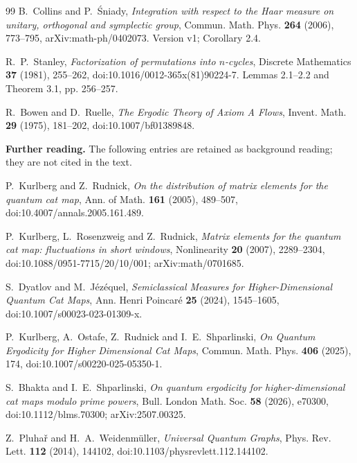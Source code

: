 \begin{thebibliography}{99}
B.~Collins and P.~{\'S}niady,
\emph{Integration with respect to the Haar measure on unitary, orthogonal and symplectic group},
Commun. Math. Phys. \textbf{264} (2006), 773--795,
arXiv:math-ph/0402073.
Version v1; Corollary 2.4.

R.~P.~Stanley,
\emph{Factorization of permutations into $n$-cycles},
Discrete Mathematics \textbf{37} (1981), 255--262,
doi:10.1016/0012-365x(81)90224-7.
Lemmas 2.1--2.2 and Theorem 3.1, pp. 256--257.

R.~Bowen and D.~Ruelle,
\emph{The Ergodic Theory of Axiom A Flows},
Invent. Math. \textbf{29} (1975), 181--202,
doi:10.1007/bf01389848.

\item[] \textbf{Further reading.} The following entries are retained
as background reading; they are not cited in the text.

P.~Kurlberg and Z.~Rudnick,
\emph{On the distribution of matrix elements for the quantum cat map},
Ann. of Math. \textbf{161} (2005), 489--507,
doi:10.4007/annals.2005.161.489.

P.~Kurlberg, L.~Rosenzweig and Z.~Rudnick,
\emph{Matrix elements for the quantum cat map: fluctuations in short windows},
Nonlinearity \textbf{20} (2007), 2289--2304,
doi:10.1088/0951-7715/20/10/001; arXiv:math/0701685.

S.~Dyatlov and M.~J\'ez\'equel,
\emph{Semiclassical Measures for Higher-Dimensional Quantum Cat Maps},
Ann. Henri Poincar\'e \textbf{25} (2024), 1545--1605,
doi:10.1007/s00023-023-01309-x.

P.~Kurlberg, A.~Ostafe, Z.~Rudnick and I.~E.~Shparlinski,
\emph{On Quantum Ergodicity for Higher Dimensional Cat Maps},
Commun. Math. Phys. \textbf{406} (2025), 174,
doi:10.1007/s00220-025-05350-1.

S.~Bhakta and I.~E.~Shparlinski,
\emph{On quantum ergodicity for higher-dimensional cat maps modulo prime powers},
Bull. London Math. Soc. \textbf{58} (2026), e70300,
doi:10.1112/blms.70300; arXiv:2507.00325.

Z.~Pluha\v r and H.~A.~Weidenm\"uller,
\emph{Universal Quantum Graphs},
Phys. Rev. Lett. \textbf{112} (2014), 144102,
doi:10.1103/physrevlett.112.144102.


\end{thebibliography}
